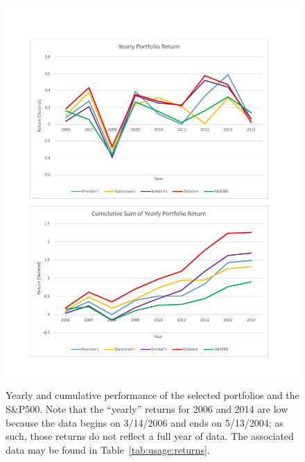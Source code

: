\begin{figure}[htb]
	\begin{center}
		\includegraphics[width=1\linewidth]
		{ch-usage/figures/Results_YearlyReturns.pdf}
		\caption[Yearly and cumulative performance of the selected portfolios 
		and the S\&P500.]{Yearly and cumulative performance of the selected 
		portfolios and the S\&P500. Note that the ``yearly'' returns for 2006 
		and 2014 are low because the data begins on 3/14/2006 and ends on 
		5/13/2004; as such, those returns do not reflect a full year of data. 
		The associated data may be found in Table~\ref{tab:usage:returns}.}
		\label{fig:usage:returns}
	\end{center}
\end{figure}




